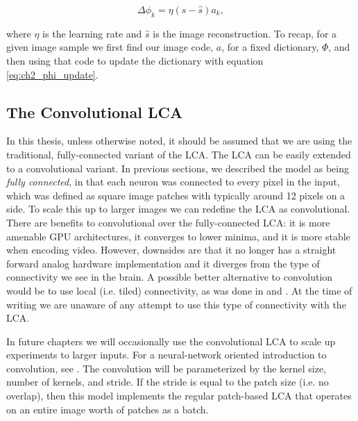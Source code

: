 \begin{equation}\label{eq:ch2_phi_update}
    \Delta \phi_{k} = \eta (s - \hat{s}) a_{k},
\end{equation}

\noindent where $\eta$ is the learning rate and $\hat{s}$ is the image reconstruction. To recap, for a given image sample we first find our image code, $a$, for a fixed dictionary, $\Phi$, and then using that code to update the dictionary with equation \eqref{eq:ch2_phi_update}.


\subsection{The Convolutional LCA}
In this thesis, unless otherwise noted, it should be assumed that we are using the traditional, fully-connected variant of the LCA. The LCA can be easily extended to a convolutional variant. In previous sections, we described the model as being \textit{fully connected}, in that each neuron was connected to every pixel in the input, which was defined as square image patches with typically around 12 pixels on a side. To scale this up to larger images we can redefine the LCA as convolutional. There are benefits to convolutional over the fully-connected LCA: it is more amenable GPU architectures, it converges to lower minima, and it is more stable when encoding video. However, downsides are that it no longer has a straight forward analog hardware implementation and it diverges from the type of connectivity we see in the brain. A possible better alternative to convolution would be to use local (i.e. tiled) connectivity, as was done in \parencite{le2011building} and \parencite{ngiam2010tiled}. At the time of writing we are unaware of any attempt to use this type of connectivity with the LCA.

In future chapters we will occasionally use the convolutional LCA to scale up experiments to larger inputs. For a neural-network oriented introduction to convolution, see \parencite{goodfellow2016deep}. The convolution will be parameterized by the kernel size, number of kernels, and stride. If the stride is equal to the patch size (i.e. no overlap), then this model implements the regular patch-based LCA that operates on an entire image worth of patches as a batch.

